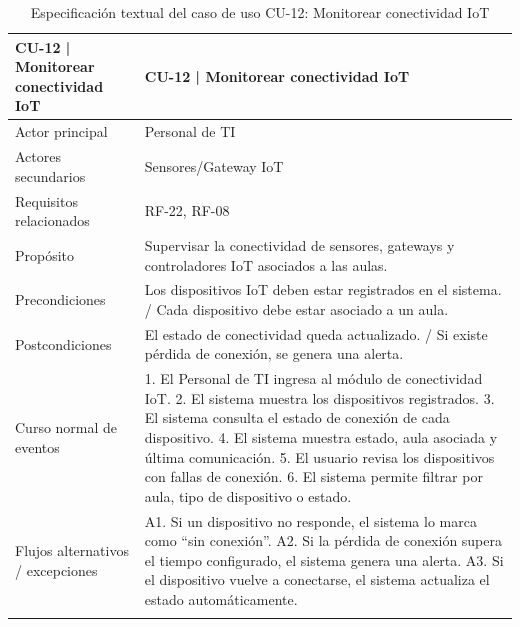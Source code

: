 \begingroup
\small
\begin{longtable}{|p{7.8cm}|p{7.8cm}|}
\hline
CU-12 | Monitorear conectividad IoT & CU-12 | Monitorear conectividad IoT \\ \hline
Actor principal & Personal de TI \\ \hline
Actores secundarios & Sensores/Gateway IoT \\ \hline
Requisitos relacionados & RF-22, RF-08 \\ \hline
Propósito & Supervisar la conectividad de sensores, gateways y controladores IoT asociados a las aulas. \\ \hline
Precondiciones & Los dispositivos IoT deben estar registrados en el sistema. / Cada dispositivo debe estar asociado a un aula. \\ \hline
Postcondiciones & El estado de conectividad queda actualizado. / Si existe pérdida de conexión, se genera una alerta. \\ \hline
Curso normal de eventos & 1. El Personal de TI ingresa al módulo de conectividad IoT. 2. El sistema muestra los dispositivos registrados. 3. El sistema consulta el estado de conexión de cada dispositivo. 4. El sistema muestra estado, aula asociada y última comunicación. 5. El usuario revisa los dispositivos con fallas de conexión. 6. El sistema permite filtrar por aula, tipo de dispositivo o estado. \\ \hline
Flujos alternativos / excepciones & A1. Si un dispositivo no responde, el sistema lo marca como ``sin conexión''. A2. Si la pérdida de conexión supera el tiempo configurado, el sistema genera una alerta. A3. Si el dispositivo vuelve a conectarse, el sistema actualiza el estado automáticamente. \\ \hline
\caption{Especificación textual del caso de uso CU-12: Monitorear conectividad IoT}
\end{longtable}
\endgroup

